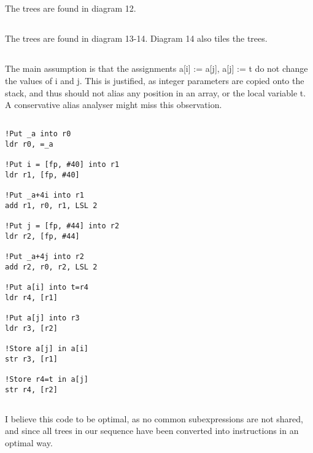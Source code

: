 \subsection{}
The trees are found in diagram 12.

\subsection{}
The trees are found in diagram 13-14. Diagram 14 also tiles the trees.

\subsection{}
The main assumption is that the assignments a[i] := a[j], a[j] := t do not change the values of i and j. This is justified, as integer parameters are copied onto the stack, and thus should not alias any position in an array, or the local variable t. A conservative alias analyser might miss this observation.

\subsection{}
\begin{lstlisting}
!Put _a into r0
ldr r0, =_a

!Put i = [fp, #40] into r1
ldr r1, [fp, #40]

!Put _a+4i into r1
add r1, r0, r1, LSL 2

!Put j = [fp, #44] into r2
ldr r2, [fp, #44]

!Put _a+4j into r2
add r2, r0, r2, LSL 2

!Put a[i] into t=r4
ldr r4, [r1]

!Put a[j] into r3
ldr r3, [r2]

!Store a[j] in a[i]
str r3, [r1]

!Store r4=t in a[j]
str r4, [r2]
\end{lstlisting}

\subsection{}
I believe this code to be optimal, as no common subexpressions are not shared, and since all trees in our sequence have been converted into instructions in an optimal way.
